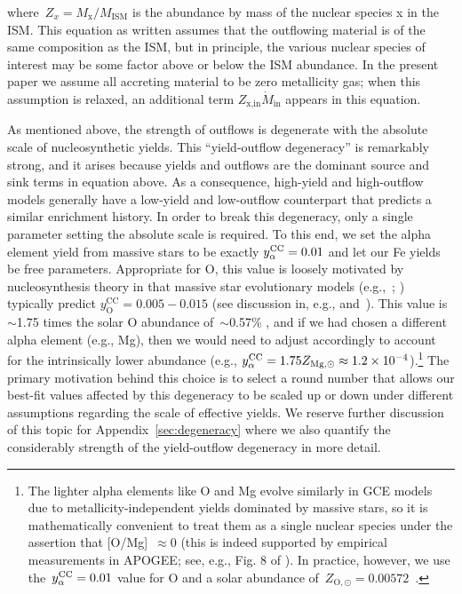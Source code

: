 \documentclass[ms.tex]{subfiles}
\begin{document}
where~$Z_x = M_\text{x} / M_\text{ISM}$ is the abundance by mass of the nuclear
species x in the ISM.
This equation as written assumes that the outflowing material is of the same
composition as the ISM, but in principle, the various nuclear species of
interest may be some factor above or below the ISM abundance.
In the present paper we assume all accreting material to be zero metallicity
gas; when this assumption is relaxed, an additional term
$Z_\text{x,in}\dot{M}_\text{in}$ appears in this equation.
\par
As mentioned above, the strength of outflows is degenerate with the absolute
scale of nucleosynthetic yields.
This ``yield-outflow degeneracy'' is remarkably strong, and it arises because
yields and outflows are the dominant source and sink terms in equation
 above.
As a consequence, high-yield and high-outflow models generally have a
low-yield and low-outflow counterpart that predicts a similar enrichment
history.
In order to break this degeneracy, only a single parameter setting the absolute
scale is required.
To this end, we set the alpha element yield from massive stars to be exactly
$y_\alpha^\text{CC} = 0.01$ and let our Fe yields be free parameters.
Appropriate for O, this value is loosely motivated by nucleosynthesis theory in
that massive star evolutionary models (e.g.,~\citealp*{Nomoto2013};
\citealp{Sukhbold2016, Limongi2018}) typically predict
$y_\text{O}^\text{CC} = 0.005 - 0.015$ (see discussion in, e.g.,
\citealp{Weinberg2017} and~\citealp{Johnson2020}).
This value is~$\sim$1.75 times the solar O abundance of~$\sim$0.57\%
\citep{Asplund2009}, and if we had chosen a different alpha element (e.g., Mg),
then we would need to adjust accordingly to account for the intrinsically lower
abundance (e.g., $y_\alpha^\text{CC} = 1.75 Z_{\text{Mg},\odot} \approx
1.2\times10^{-4}$).\footnote{
	The lighter alpha elements like O and Mg evolve similarly in GCE models due
	to metallicity-independent yields dominated by massive stars, so it is
	mathematically convenient to treat them as a single nuclear species
	under the assertion that [O/Mg]~$\approx 0$ (this is indeed supported by
	empirical measurements in APOGEE; see, e.g., Fig. 8 of
	\citealt{Weinberg2019}).
	In practice, however, we use the~$y_\alpha^\text{CC} = 0.01$ value for O and a solar
	abundance of~$Z_{\text{O},\odot} = 0.00572$~\citep{Asplund2009}.
}
The primary motivation behind this choice is to select a round number that
allows our best-fit values affected by this degeneracy to be scaled up or down
under different assumptions regarding the scale of effective yields.
We reserve further discussion of this topic for Appendix~\ref{sec:degeneracy}
where we also quantify the considerably strength of the yield-outflow
degeneracy in more detail.
\end{document}
